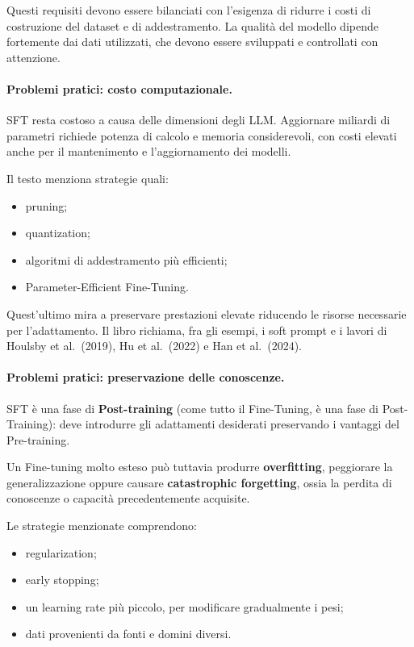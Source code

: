 Questi requisiti devono essere bilanciati con l'esigenza
di ridurre i costi di costruzione del dataset
e di addestramento. La qualità del modello dipende
fortemente dai dati utilizzati, che devono essere
sviluppati e controllati con attenzione.


\paragraph{Problemi pratici: costo computazionale.}
SFT resta costoso a causa delle dimensioni degli LLM.
Aggiornare miliardi di parametri richiede potenza
di calcolo e memoria considerevoli, con costi elevati
anche per il mantenimento e l'aggiornamento dei modelli.

Il testo menziona strategie quali:

\begin{itemize}
    \item pruning;

    \item quantization;

    \item algoritmi di addestramento più efficienti;

    \item Parameter-Efficient Fine-Tuning.
\end{itemize}

Quest'ultimo mira a preservare prestazioni elevate
riducendo le risorse necessarie per l'adattamento.
Il libro richiama, fra gli esempi, i soft prompt
e i lavori di Houlsby et al.\ (2019),
Hu et al.\ (2022) e Han et al.\ (2024).

\paragraph{Problemi pratici: preservazione delle conoscenze.}
SFT è una fase di \textbf{Post-training} (come tutto il Fine-Tuning, è una fase di Post-Training):
deve introdurre gli adattamenti desiderati preservando
i vantaggi del Pre-training.

Un Fine-tuning molto esteso può tuttavia produrre
\textbf{overfitting}, peggiorare la generalizzazione
oppure causare \textbf{catastrophic forgetting},
ossia la perdita di conoscenze o capacità precedentemente
acquisite.

Le strategie menzionate comprendono:

\begin{itemize}
    \item regularization;

    \item early stopping;

    \item un learning rate più piccolo, per modificare
    gradualmente i pesi;

    \item dati provenienti da fonti e domini diversi.
\end{itemize}

